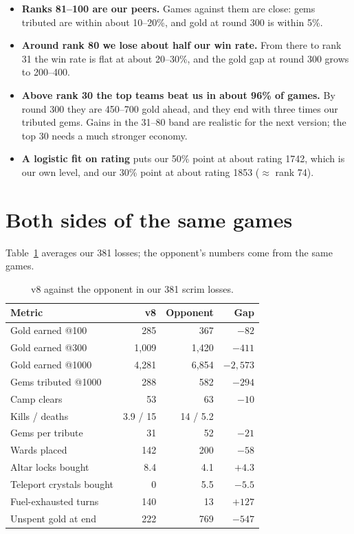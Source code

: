 \documentclass[11pt,a4paper]{article}
\begin{document}
\begin{itemize}
  \item \textbf{Ranks 81--100 are our peers.} Games against them are close: gems tributed are within about 10--20\%, and gold at round 300 is within 5\%.
  \item \textbf{Around rank 80 we lose about half our win rate.} From there to rank 31 the win rate is flat at about 20--30\%, and the gold gap at round 300 grows to 200--400.
  \item \textbf{Above rank 30 the top teams beat us in about 96\% of games.} By round 300 they are 450--700 gold ahead, and they end with three times our tributed gems. Gains in the 31--80 band are realistic for the next version; the top 30 needs a much stronger economy.
  \item \textbf{A logistic fit on rating} puts our 50\% point at about rating 1742, which is our own level, and our 30\% point at about rating 1853 ($\approx$ rank 74).
\end{itemize}

\section{Both sides of the same games}

Table~\ref{tab:losses} averages our 381 losses; the opponent's numbers come from the same games.

\begin{table}[H]
\centering\small
\begin{tabular}{lrrr}
\toprule
Metric & v8 & Opponent & Gap \\
\midrule
Gold earned @100          & 285   & 367   & $-82$ \\
Gold earned @300          & 1,009 & 1,420 & $-411$ \\
Gold earned @1000         & 4,281 & 6,854 & $-2{,}573$ \\
Gems tributed @1000       & 288   & 582   & $-294$ \\
Camp clears               & 53    & 63    & $-10$ \\
Kills / deaths            & 3.9 / 15 & 14 / 5.2 & \\
Gems per tribute          & 31    & 52    & $-21$ \\
Wards placed              & 142   & 200   & $-58$ \\
Altar locks bought        & 8.4   & 4.1   & $+4.3$ \\
Teleport crystals bought  & 0     & 5.5   & $-5.5$ \\
Fuel-exhausted turns      & 140   & 13    & $+127$ \\
Unspent gold at end       & 222   & 769   & $-547$ \\
\bottomrule
\end{tabular}
\caption{v8 against the opponent in our 381 scrim losses.}
\label{tab:losses}
\end{table}
\end{document}
